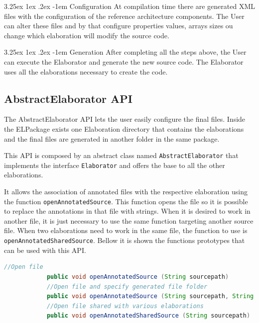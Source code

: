 \documentclass{report}
\makeatletter
\renewcommand\paragraph{\@startsection{paragraph}{5}{\z@}%
	{3.25ex \@plus1ex \@minus.2ex}%
	{-1em}%
	{\normalfont\normalsize\bfseries}}
\makeatother
\begin{document}
		\paragraph{Configuration} At compilation time there are generated XML files with the configuration of the reference architecture components. The User can alter these files and by that configure properties values, arrays sizes ou change which elaboration will modify the source code.

		\paragraph{Generation} After completing all the steps above, the User can execute the Elaborator and generate the new source code. The Elaborator uses all the elaborations necessary to create the code.
		
		\subsection{AbstractElaborator API}
		
		\par The AbstractElaborator API lets the user easily configure the final files. Inside the ELPackage exists one Elaboration directory that contains the elaborations and the final files are generated in another folder in the same package.
		\par This API is composed by an abstract class named \texttt{AbstractElaborator} that implements the interface \texttt{Elaborator} and offers the base to all the other elaborations.
		\par It allows the association of annotated files with the respective elaboration using the function \texttt{openAnnotatedSource}. This function opens the file so it is possible to replace the annotations in that file with strings. When it is desired to work in another file, it is just necessary to use the same function targeting another source file. When two elaborations need to work in the same file, the function to use is \texttt{openAnnotatedSharedSource}. Bellow it is shown the functions prototypes that can be used with this API.
		
		\begin{lstlisting}[language=Java]
			//Open file
			public void openAnnotatedSource (String sourcepath)
			//Open file and specify generated file folder
			public void openAnnotatedSource (String sourcepath, String targetPath)
			//Open file shared with various elaborations
			public void openAnnotatedSharedSource (String sourcepath)
		\end{lstlisting}
		
\end{document}

